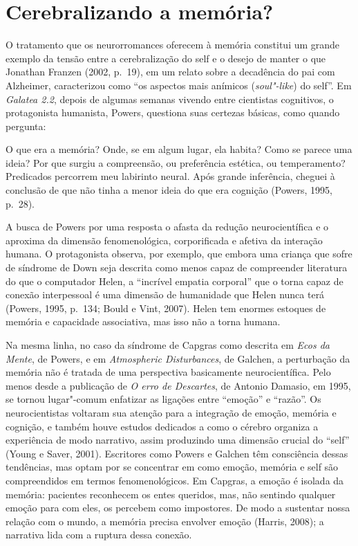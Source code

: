 \section{Cerebralizando a memória?}

O tratamento que os neurorromances oferecem à memória constitui um
grande exemplo da tensão entre a cerebralização do self e o desejo de
manter o que Jonathan Franzen (2002, p.~19), em um relato sobre a
decadência do pai com Alzheimer, caracterizou como ``os aspectos mais
anímicos (\emph{soul"-like}) do self''. Em \emph{Galatea 2.2}, depois de
algumas semanas vivendo entre cientistas cognitivos, o protagonista
humanista, Powers, questiona suas certezas básicas, como quando
pergunta:

O que era a memória? Onde, se em algum lugar, ela habita? Como se parece
uma ideia? Por que surgiu a compreensão, ou preferência estética, ou
temperamento? Predicados percorrem meu labirinto neural. Após grande
inferência, cheguei à conclusão de que não tinha a menor ideia do que
era cognição (Powers, 1995, p.~28).

A busca de Powers por uma resposta o afasta da redução neurocientífica e
o aproxima da dimensão fenomenológica, corporificada e afetiva da
interação humana. O protagonista observa, por exemplo, que embora uma
criança que sofre de síndrome de Down seja descrita como menos capaz de
compreender literatura do que o computador Helen, a ``incrível empatia
corporal'' que o torna capaz de conexão interpessoal é uma dimensão de
humanidade que Helen nunca terá (Powers, 1995, p.~134; Bould e Vint,
2007). Helen tem enormes estoques de memória e capacidade associativa,
mas isso não a torna humana.

Na mesma linha, no caso da síndrome de Capgras como descrita em
\emph{Ecos da Mente}, de Powers, e em \emph{Atmospheric Disturbances},
de Galchen, a perturbação da memória não é tratada de uma perspectiva
basicamente neurocientífica. Pelo menos desde a publicação de \emph{O
erro de Descartes}, de Antonio Damasio, em 1995, se tornou lugar"-comum
enfatizar as ligações entre ``emoção'' e ``razão''. Os neurocientistas
voltaram sua atenção para a integração de emoção, memória e cognição, e
também houve estudos dedicados a como o cérebro organiza a experiência
de modo narrativo, assim produzindo uma dimensão crucial do ``self''
(Young e Saver, 2001). Escritores como Powers e Galchen têm consciência
dessas tendências, mas optam por se concentrar em como emoção, memória e
self são compreendidos em termos fenomenológicos. Em Capgras, a emoção é
isolada da memória: pacientes reconhecem os entes queridos, mas, não
sentindo qualquer emoção para com eles, os percebem como impostores. De
modo a sustentar nossa relação com o mundo, a memória precisa envolver
emoção (Harris, 2008); a narrativa lida com a ruptura dessa conexão.

